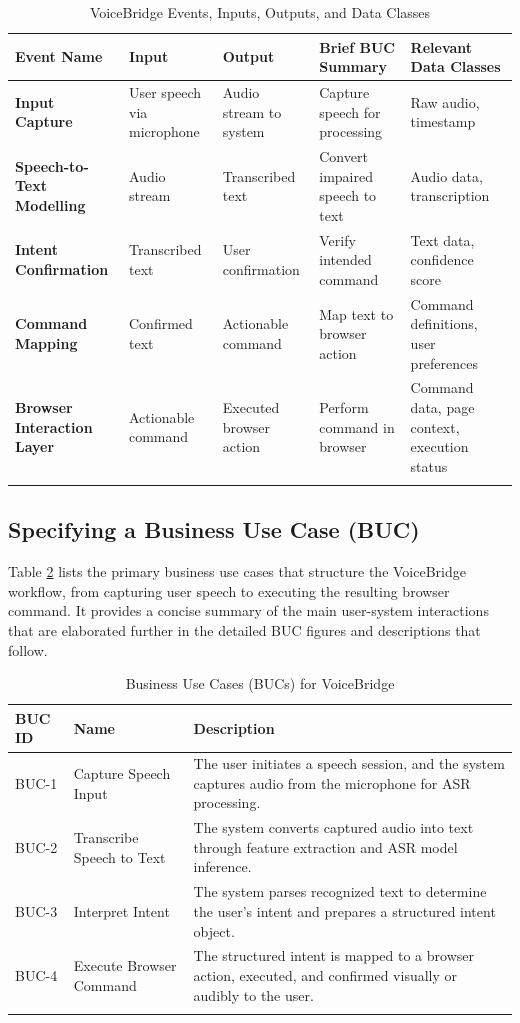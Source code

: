 \documentclass[11pt]{article}
\begin{document}
\begin{table}[H]
\centering
\begin{tabularx}{\textwidth}{X X X X X}
\toprule
\textbf{Event Name} & \textbf{Input} & \textbf{Output} & \textbf{Brief BUC Summary} & \textbf{Relevant Data Classes} \\
\midrule
\textbf{Input Capture} & User speech via microphone & Audio stream to system & Capture speech for processing & Raw audio, timestamp \\
\hline
\textbf{Speech-to-Text Modelling} & Audio stream & Transcribed text & Convert impaired speech to text & Audio data, transcription \\
\hline
\textbf{Intent Confirmation} & Transcribed text & User confirmation & Verify intended command & Text data, confidence score \\
\hline
\textbf{Command Mapping} & Confirmed text & Actionable command & Map text to browser action & Command definitions, user preferences \\
\hline
\textbf{Browser Interaction Layer} & Actionable command & Executed browser action & Perform command in browser & Command data, page context, execution status \\
\bottomrule
\caption{VoiceBridge Events, Inputs, Outputs, and Data Classes}
\label{tab:work-partitioning}
\end{tabularx}
\end{table}

\subsection{Specifying a Business Use Case (BUC)} 
Table \ref{tab:buc-summary} lists the primary business use cases that structure the VoiceBridge workflow, from capturing user speech to executing the resulting browser command. It provides a concise summary of the main user-system interactions that are elaborated further in the detailed BUC figures and descriptions that follow.


\begin{table}[H]
\centering
\begin{tabularx}{\textwidth}{p{2cm}p{3cm}X}
\toprule
\textbf{BUC ID} & \textbf{Name} & \textbf{Description} \\
\midrule
BUC-1 & Capture Speech Input & The user initiates a speech session, and the system captures audio from the microphone for ASR processing. \\
\hline
BUC-2 & Transcribe Speech to Text & The system converts captured audio into text through feature extraction and ASR model inference. \\
\hline
BUC-3 & Interpret Intent & The system parses recognized text to determine the user’s intent and prepares a structured intent object. \\
\hline
BUC-4 & Execute Browser Command & The structured intent is mapped to a browser action, executed, and confirmed visually or audibly to the user. \\
\bottomrule
\caption{Business Use Cases (BUCs) for VoiceBridge}
\label{tab:buc-summary}
\end{tabularx}
\end{table}
\end{document}
